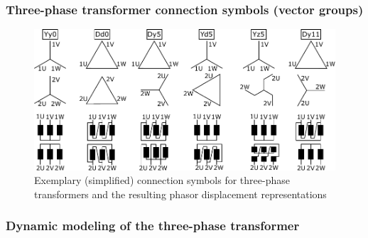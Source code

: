 \begin{frame}
	\frametitle{Three-phase transformer connection symbols (vector groups)}
	\vspace{-0.1cm}
	\begin{figure}
		\includegraphics[height=0.75\textheight]{fig/lec04/Three_phase_transformer_connection_symbols_01.pdf}
		\caption{Exemplary (simplified) connection symbols for three-phase transformers and the resulting phasor displacement representations}
		\label{fig:Three_phase_transformer_connection_symbols_01}
	\end{figure}
\end{frame}

\begin{frame}
	\frametitle{Dynamic modeling of the three-phase transformer}
		
\end{frame}
